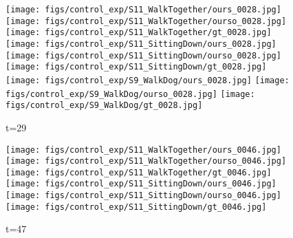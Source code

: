 \documentclass{article}
\begin{document}
\begin{appendix}
\begin{figure*}[!thbp]
\begin{subfigure}{0.12\linewidth}
	\end{subfigure} 
    \begin{subfigure}{0.12\linewidth}
        \caption*{t=29}
        \vspace{-7pt}
	    \texttt{[image: figs/control\_exp/S11\_WalkTogether/ours\_0028.jpg]}
	    \texttt{[image: figs/control\_exp/S11\_WalkTogether/ourso\_0028.jpg]}
	    \vspace{.2cm}
  		\texttt{[image: figs/control\_exp/S11\_WalkTogether/gt\_0028.jpg]}
  		\texttt{[image: figs/control\_exp/S11\_SittingDown/ours\_0028.jpg]}
  		\texttt{[image: figs/control\_exp/S11\_SittingDown/ourso\_0028.jpg]}
  		\vspace{.2cm}
  		\texttt{[image: figs/control\_exp/S11\_SittingDown/gt\_0028.jpg]}
  		\texttt{[image: figs/control\_exp/S9\_WalkDog/ours\_0028.jpg]}
  		\texttt{[image: figs/control\_exp/S9\_WalkDog/ourso\_0028.jpg]}
  		\vspace{.2cm}
  		\texttt{[image: figs/control\_exp/S9\_WalkDog/gt\_0028.jpg]}
	\end{subfigure} 
    \begin{subfigure}{0.12\linewidth}
        \caption*{t=47}
        \vspace{-7pt}
	    \texttt{[image: figs/control\_exp/S11\_WalkTogether/ours\_0046.jpg]}
	    \texttt{[image: figs/control\_exp/S11\_WalkTogether/ourso\_0046.jpg]}
	    \vspace{.2cm}
  		\texttt{[image: figs/control\_exp/S11\_WalkTogether/gt\_0046.jpg]}
  		\texttt{[image: figs/control\_exp/S11\_SittingDown/ours\_0046.jpg]}
  		\texttt{[image: figs/control\_exp/S11\_SittingDown/ourso\_0046.jpg]}
  		\vspace{.2cm}
  		\texttt{[image: figs/control\_exp/S11\_SittingDown/gt\_0046.jpg]}

\end{subfigure}
\end{figure*}
\end{appendix}
\end{document}
